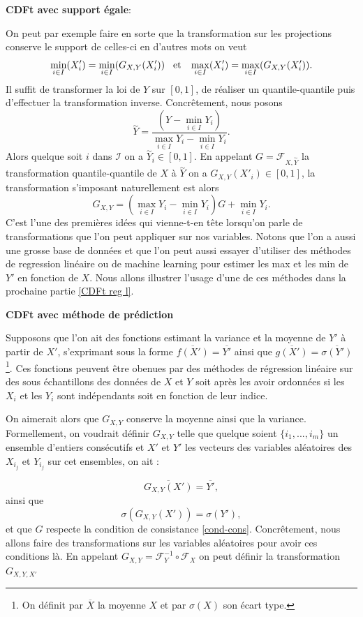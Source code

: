 \documentclass[a4paper,11pt]{article}
\numberwithin{equation}{section}
\begin{document}
\noindent \textbf{CDFt avec support égale}:

On peut par exemple faire en sorte que la transformation sur les projections conserve le support de celles-ci en d'autres mots on veut
\[ \min_{i \in I}(X'_i)=\min_{i \in I}(G_{X,Y}(X'_i)) \hspace{3mm} \textrm{et} \hspace{3mm}  \max_{i \in I}(X'_i)=\max_{i \in I}(G_{X,Y}(X'_i)).\]
Il suffit de transformer la loi de $Y$ sur $[0,1]$, de réaliser un quantile-quantile puis d'effectuer la transformation inverse. Concrêtement, nous posons 
\[\overset{\sim}{Y}= \frac{(Y-\min_{i\in I}Y_i)}{\max_{i\in I}Y_i- \min_{i\in I}Y_i}.\]
Alors quelque soit $i$ dans $\mathcal{I}$ on a $\overset{\sim}{Y}_i \in [0,1]$. En appelant $G= \mathcal{F}_{X,\overset{\sim}{Y}}$ la transformation quantile-quantile de $X$ à $\overset{\sim}{Y}$ on a $G_{X,Y}(X'_i) \in [0,1]$, la transformation s'imposant naturellement est alors
\[ G_{X,Y}= (\max_{i\in I}Y_i- \min_{i\in I}Y_i)G + \min_{i\in I}Y_i.\]
C'est l'une des premières idées qui vienne-t-en tête lorsqu'on parle de transformations que l'on peut appliquer sur nos variables. Notons que l'on a aussi une grosse base de données et que l'on peut aussi essayer d'utiliser des méthodes de regression linéaire ou de machine learning pour estimer les max et les min de $Y'$ en fonction de $X$. Nous allons illustrer l'usage d'une de ces méthodes dans la prochaine partie \ref{CDFt reg l}.

\noindent \textbf{CDFt avec méthode de prédiction}
\label{CDFt reg l}

Supposons que l'on ait des fonctions estimant la variance et la moyenne de $Y'$ à partir de $X'$, s'exprimant sous la forme $\overline{f(X')} = \overline{Y'}$ ainsi que $\overline{g(X')} = \overline{\sigma(Y')}$ \footnote{On définit par $\overline{X}$ la  moyenne $X$ et par $\sigma(X)$ son écart type.}. Ces fonctions peuvent être obenues par des méthodes de régression linéaire sur des sous échantillons des données de $X$ et $Y$ soit après les avoir ordonnées si les $X_i$ et les $Y_i$ sont indépendants soit en fonction de leur indice.

On aimerait alors que $G_{X,Y}$ conserve la moyenne ainsi que la variance. Formellement, on voudrait définir $G_{X,Y}$ telle que quelque soient $\{i_1,...,i_m\}$ un ensemble d'entiers consécutifs et $X'$ et $Y'$ les vecteurs des variables aléatoires des $X_{i_j}$ et $Y_{i_j}$ sur cet ensembles, on ait :

\begin{equation}
	\label{cond-mu}
	\overline{G_{X,Y}(X')}=\overline{Y'},
\end{equation}
ainsi que
\begin{equation}
	\label{cond-sigma}
	\sigma({G_{X,Y}(X')})=\sigma(Y'),
\end{equation}
et que $G$ respecte la condition de consistance \eqref{cond-cons}.
Concrêtement, nous allons faire des transformations sur les variables aléatoires pour avoir ces conditions là. En appelant $G_{X,Y}= \mathcal{F}^{-1}_{Y}\circ\mathcal{F}_{X}$ on peut définir la transformation $G_{X,Y,X'}$
\end{document}
